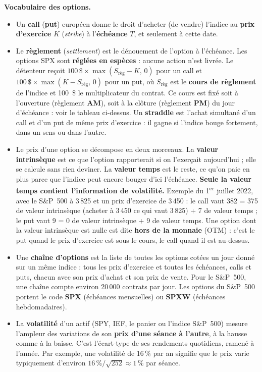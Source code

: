 \documentclass[10pt,a4paper]{article}
\begin{document}
\textbf{Vocabulaire des options.}
\begin{itemize}
\item Un \textbf{call} (\textbf{put}) européen donne le droit d'acheter (de vendre) l'indice au \textbf{prix d'exercice} $K$ (\emph{strike}) à l'\textbf{échéance} $T$, et seulement à cette date.
\item Le \textbf{règlement} (\emph{settlement}) est le dénouement de l'option à l'échéance. Les options SPX sont \textbf{réglées en espèces} : aucune action n'est livrée. Le détenteur reçoit $100\,\$\times\max(S_{\mathrm{règ}}-K,\,0)$ pour un call et $100\,\$\times\max(K-S_{\mathrm{règ}},\,0)$ pour un put, où $S_{\mathrm{règ}}$ est le \textbf{cours de règlement} de l'indice et 100~\$ le multiplicateur du contrat. Ce cours est fixé soit à l'ouverture (règlement \textbf{AM}), soit à la clôture (règlement \textbf{PM}) du jour d'échéance : voir le tableau ci-dessus. Un \textbf{straddle} est l'achat simultané d'un call et d'un put de même prix d'exercice : il gagne si l'indice bouge fortement, dans un sens ou dans l'autre.
\item Le prix d'une option se décompose en deux morceaux. La \textbf{valeur intrinsèque} est ce que l'option rapporterait si on l'exerçait aujourd'hui ; elle se calcule sans rien deviner. La \textbf{valeur temps} est le reste, ce qu'on paie en plus parce que l'indice peut encore bouger d'ici l'échéance. \textbf{Seule la valeur temps contient l'information de volatilité.} Exemple du 1\textsuperscript{er} juillet 2022, avec le S\&P~500 à 3\,825 et un prix d'exercice de 3\,450 : le call vaut 382 = 375 de valeur intrinsèque (acheter à 3\,450 ce qui vaut 3\,825) + 7 de valeur temps ; le put vaut 9 = 0 de valeur intrinsèque + 9 de valeur temps. Une option dont la valeur intrinsèque est nulle est dite \textbf{hors de la monnaie} (OTM) : c'est le put quand le prix d'exercice est sous le cours, le call quand il est au-dessus.
\item Une \textbf{chaîne d'options} est la liste de toutes les options cotées un jour donné sur un même indice : tous les prix d'exercice et toutes les échéances, calls et puts, chacun avec son prix d'achat et son prix de vente. Pour le S\&P~500, une chaîne compte environ 20\,000 contrats par jour. Les options du S\&P~500 portent le code \textbf{SPX} (échéances mensuelles) ou \textbf{SPXW} (échéances hebdomadaires).
\item La \textbf{volatilité} d'un actif (SPY, IEF, le panier ou l'indice S\&P~500) mesure l'ampleur des variations de son \textbf{prix d'une séance à l'autre}, à la hausse comme à la baisse. C'est l'écart-type de ses rendements quotidiens, ramené à l'année. Par exemple, une volatilité de 16\,\% par an signifie que le prix varie typiquement d'environ $16\,\%/\sqrt{252}\approx1\,\%$ par séance.

\end{itemize}
\end{document}
